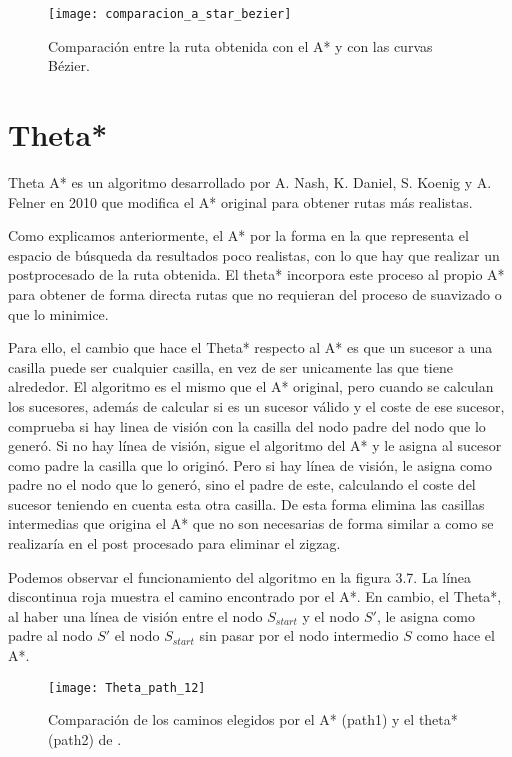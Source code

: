 \begin{figure}[!htpb]
    \centering
    \texttt{[image: comparacion\_a\_star\_bezier]}
    \caption[Comparativa de rutas con A* y con curvas Bézier]{Comparación entre la ruta obtenida con el A* y con las curvas Bézier.}
    \label{fig:basics AFM sketch}
\end{figure}

\newpage

\section{Theta*} \label{referenciaTheta}
Theta A* es un algoritmo desarrollado por A. Nash, K. Daniel, S. Koenig y A. Felner \cite{thetaestrella, thetaestrellaweb} en 2010 que modifica el A* original para obtener rutas más realistas.

Como explicamos anteriormente, el A* por la forma en la que representa el espacio de búsqueda da resultados poco realistas, con lo que hay que realizar un postprocesado de la ruta obtenida. El theta* incorpora este proceso al propio A* para obtener de forma directa rutas que no requieran del proceso de suavizado o que lo minimice.

Para ello, el cambio que hace el Theta* respecto al A* es que un sucesor a una casilla puede ser cualquier casilla, en vez de ser unicamente las que tiene alrededor. El algoritmo es el mismo que el A* original, pero cuando se calculan los sucesores, además de calcular si es un sucesor válido y el coste de ese sucesor, comprueba si hay linea de visión con la casilla del nodo padre del nodo que lo generó. Si no hay línea de visión, sigue el algoritmo del A* y le asigna al sucesor como padre la casilla que lo originó. Pero si hay línea de visión, le asigna como padre no el nodo que lo generó, sino el padre de este, calculando el coste del sucesor teniendo en cuenta esta otra casilla. De esta forma elimina las casillas intermedias que origina el A* que no son necesarias de forma similar a como se realizaría en el post procesado para eliminar el zigzag.

Podemos observar el funcionamiento del algoritmo en la figura 3.7. La línea discontinua roja muestra el camino encontrado por el A*. En cambio, el Theta*, al haber una línea de visión entre el nodo $S_{start}$ y el nodo $S'$, le asigna como padre al nodo $S'$ el nodo $S_{start}$ sin pasar por el nodo intermedio $S$ como hace el A*.

\begin{figure}[htpb]
    \centering
    \texttt{[image: Theta\_path\_12]}
    \caption[Comparación de los caminos elegidos por el A* y el Theta*]{Comparación de los caminos elegidos por el A* (path1) y el theta* (path2) de \cite{thetaestrellawebimagen}.}
    \label{fig:basics AFM sketch}
\end{figure}


